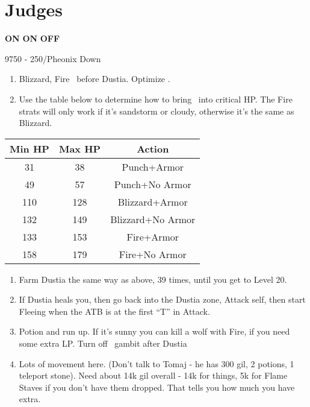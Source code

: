 \chapter{Judges}
\begin{gambit}
	\begin{itemize}
		\vaanf \textbf{ON}
		\balthierf \textbf{ON}
		\franf \textbf{OFF}
	\end{itemize}
\end{gambit}
\begin{shop}{9750 - 250/Pheonix Down}
\end{shop}
\begin{enumerate}
	\item Blizzard, Fire \vaan\ before Dustia. Optimize \vaan.
	\item Use the table below to determine how to bring \vaan\ into critical HP. The Fire strats will only work if it's sandstorm or cloudy, otherwise it's the same as Blizzard.
\end{enumerate}
\begin{center}
	\begin{tabular}{|c|c|c|} \hline
		Min HP & Max HP & Action            \\ \hline
		31     & 38     & Punch+Armor       \\ \hline
		49     & 57     & Punch+No Armor    \\ \hline
		110    & 128    & Blizzard+Armor    \\ \hline
		132    & 149    & Blizzard+No Armor \\ \hline
		133    & 153    & Fire+Armor        \\ \hline
		158    & 179    & Fire+No Armor     \\ \hline
	\end{tabular}
\end{center}
\begin{enumerate}
	\item Farm Dustia the same way as above, 39 times, until you get to Level 20.
	\item If Dustia heals you, then go back into the Dustia zone, Attack self, then start Fleeing when the ATB is at the first ``T'' in Attack.
	\item Potion and run up. If it's sunny you can kill a wolf with Fire, if you need some extra LP. Turn off \vaan\ gambit after Dustia
	\item Lots of movement here. (Don't talk to Tomaj - he has 300 gil, 2 potions, 1 teleport stone). Need about 14k gil overall - 14k for things, 5k for Flame Staves if you don't have them dropped. That tells you how much you have extra.
\end{enumerate}
